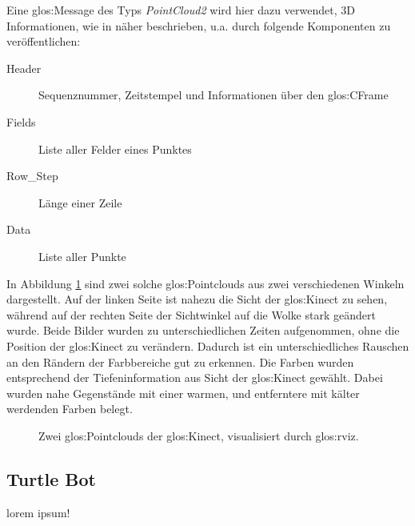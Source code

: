 Eine \gls{glos:Message} des Typs \emph{PointCloud2} wird hier dazu verwendet, 3D Informationen, wie in \cite{online:pointcloud2} näher beschrieben, u.a. durch folgende Komponenten zu veröffentlichen:

\begin{description}
	\item[Header]		Sequenznummer, Zeitstempel und Informationen über den \gls{glos:CFrame}
	\item[Fields]		Liste aller Felder eines Punktes
	\item[Row\_Step]	Länge einer Zeile
	\item[Data]		Liste aller Punkte
\end{description}

In Abbildung \ref{fig:kinectViews} sind zwei solche \glspl{glos:Pointcloud} aus zwei verschiedenen Winkeln dargestellt. Auf der linken Seite ist nahezu die Sicht der \gls{glos:Kinect} zu sehen, während auf der rechten Seite der Sichtwinkel auf die Wolke stark geändert wurde. Beide Bilder wurden zu unterschiedlichen Zeiten aufgenommen, ohne die Position der \gls{glos:Kinect} zu verändern. Dadurch ist ein unterschiedliches Rauschen an den Rändern der Farbbereiche gut zu erkennen. Die Farben wurden entsprechend der Tiefeninformation aus Sicht der \gls{glos:Kinect} gewählt. Dabei wurden nahe Gegenstände mit einer warmen, und entferntere mit kälter werdenden Farben belegt.

\begin{figure}[t]
	\centering
	\caption[Kinect Pointcloud]{Zwei \glspl{glos:Pointcloud} der \gls{glos:Kinect}, visualisiert durch \gls{glos:rviz}.}
	\label{fig:kinectViews}
\end{figure}

\subsection{Turtle Bot}
{\color{red}lorem ipsum!}